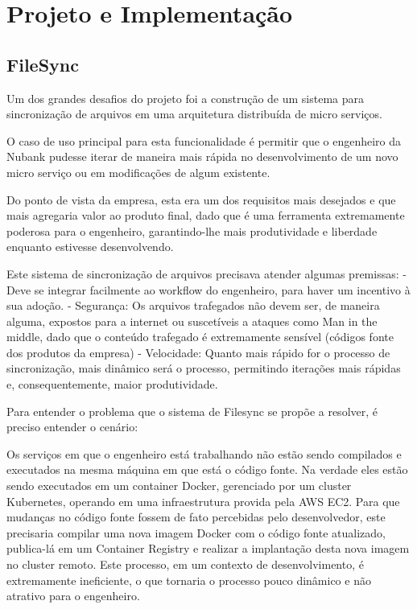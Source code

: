 \documentclass[]{politex}
\begin{document}
\chapter{Projeto e Implementação}
	\section{FileSync}

	Um dos grandes desafios do projeto foi a construção de um sistema para sincronização de arquivos em uma arquitetura distribuída de micro serviços.
	
	O caso de uso principal para esta funcionalidade é permitir que o engenheiro da Nubank pudesse iterar de maneira mais rápida no desenvolvimento de um novo micro serviço ou em modificações de algum existente.
	
	Do ponto de vista da empresa, esta era um dos requisitos mais desejados e que mais agregaria valor ao produto final, dado que é uma ferramenta extremamente poderosa para o engenheiro, garantindo-lhe mais produtividade e liberdade enquanto estivesse desenvolvendo.
	
	Este sistema de sincronização de arquivos precisava atender algumas premissas:
	- Deve se integrar facilmente ao workflow do engenheiro, para haver um incentivo à sua adoção.
	- Segurança: Os arquivos trafegados não devem ser, de maneira alguma, expostos para a internet ou suscetíveis a ataques como Man in the middle, dado que o conteúdo trafegado é extremamente sensível (códigos fonte dos produtos da empresa)
	- Velocidade: Quanto mais rápido for o processo de sincronização, mais dinâmico será o processo, permitindo iterações mais rápidas e, consequentemente, maior produtividade.

	Para entender o problema que o sistema de Filesync se propõe a resolver, é preciso entender o cenário:
	
	Os serviços em que o engenheiro está trabalhando não estão sendo compilados e executados na mesma máquina em que está o código fonte. Na verdade eles estão sendo executados em um container Docker, gerenciado por um cluster Kubernetes, operando em uma infraestrutura provida pela AWS EC2. Para que mudanças no código fonte fossem de fato percebidas pelo desenvolvedor, este precisaria compilar uma nova imagem Docker com o código fonte atualizado, publica-lá em um Container Registry e realizar a implantação desta nova imagem no cluster remoto. Este processo, em um contexto de desenvolvimento, é extremamente ineficiente, o que tornaria o processo pouco dinâmico e não atrativo para o engenheiro.
\end{document}
